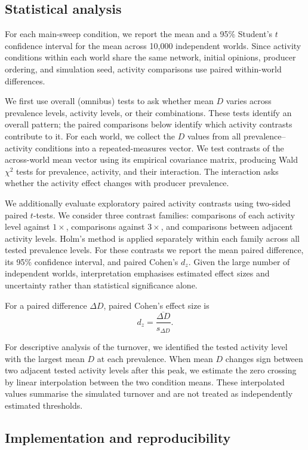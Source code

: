 \documentclass[runningheads]{llncs}
\begin{document}
\subsection{Statistical analysis}

For each main-sweep condition, we report the mean and a 95\% Student's \(t\) confidence interval for the mean across 10,000 independent worlds. Since activity conditions within each world share the same network, initial opinions, producer ordering, and simulation seed, activity comparisons use paired within-world differences.

We first use overall (omnibus) tests to ask whether mean \(D\) varies across prevalence levels, activity levels, or their combinations. These tests identify an overall pattern; the paired comparisons below identify which activity contrasts contribute to it. For each world, we collect the \(D\) values from all prevalence--activity conditions into a repeated-measures vector. We test contrasts of the across-world mean vector using its empirical covariance matrix, producing Wald \(\chi^2\) tests for prevalence, activity, and their interaction. The interaction asks whether the activity effect changes with producer prevalence.

We additionally evaluate exploratory paired activity contrasts using two-sided paired \(t\)-tests. We consider three contrast families: comparisons of each activity level against \(1\times\), comparisons against \(3\times\), and comparisons between adjacent activity levels. Holm's method is applied separately within each family across all tested prevalence levels. For these contrasts we report the mean paired difference, its 95\% confidence interval, and paired Cohen's \(d_z\). Given the large number of independent worlds, interpretation emphasises estimated effect sizes and uncertainty rather than statistical significance alone.

For a paired difference \(\Delta D\), paired Cohen's effect size is
\[
d_z=\frac{\overline{\Delta D}}{s_{\Delta D}}.
\]

For descriptive analysis of the turnover, we identified the tested activity level with the largest mean \(D\) at each prevalence. When mean \(D\) changes sign between two adjacent tested activity levels after this peak, we estimate the zero crossing by linear interpolation between the two condition means. These interpolated values summarise the simulated turnover and are not treated as independently estimated thresholds.

\subsection{Implementation and reproducibility}
\end{document}
